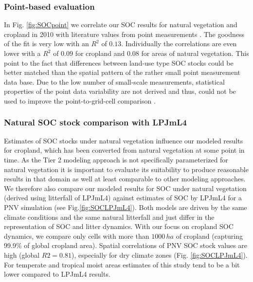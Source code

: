 \documentclass[gc, manuscript]{copernicus}
\begin{document}
\hypertarget{point-based-evaluation}{%
\subsubsection{Point-based evaluation}\label{point-based-evaluation}}

In Fig. \ref{fig:SOCpoint} we correlate our SOC results for natural vegetation and cropland in 2010 with literature values from point measurements \citep[for data base see appendix of][]{sanderman_soil_2017}. The goodness of the fit is very low with an \(R^2\) of \(0.13\). Individually the correlations are even lower with a \(R^2\) of \(0.09\) for cropland and \(0.08\) for areas of natural vegetation. This point to the fact that differences between land-use type SOC stocks could be better matched than the spatial pattern of the rather small point measurement data base.
Due to the low number of small-scale measurements, statistical properties of the point data variability are not derived and thus, could not be used to improve the point-to-grid-cell comparison \citep[see][]{rammig_generic_2018}.

\hypertarget{natural-soc-stock-comparison-with-lpjml4}{%
\subsubsection{Natural SOC stock comparison with LPJmL4}\label{natural-soc-stock-comparison-with-lpjml4}}

Estimates of SOC stocks under natural vegetation influence our modeled results for cropland, which has been converted from natural vegetation at some point in time. As the Tier 2 modeling approach \citep{ogle_cropland_in_ipcc_2019} is not specifically parameterized for natural vegetation it is important to evaluate its suitability to produce reasonable results in that domain as well at least comparable to other modeling approaches.
We therefore also compare our modeled results for SOC under natural vegetation (derived using litterfall of LPJmL4) against estimates of SOC by LPJmL4 for a PNV simulation (see Fig.\ref{fig:SOCLPJmL4}). Both models are driven by the same climate conditions and the same natural litterfall and just differ in the representation of SOC and litter dynamics. With our focus on cropland SOC dynamics, we compare only cells with more than \(1000\,\unit{ha}\) of cropland (capturing 99.9\% of global cropland area).
Spatial correlations of PNV SOC stock values are high (global \(R2=0.81\)), especially for dry climate zones (Fig. \ref{fig:SOCLPJmL4}). For temperate and tropical moist areas estimates of this study tend to be a bit lower compared to LPJmL4 results.
\end{document}
